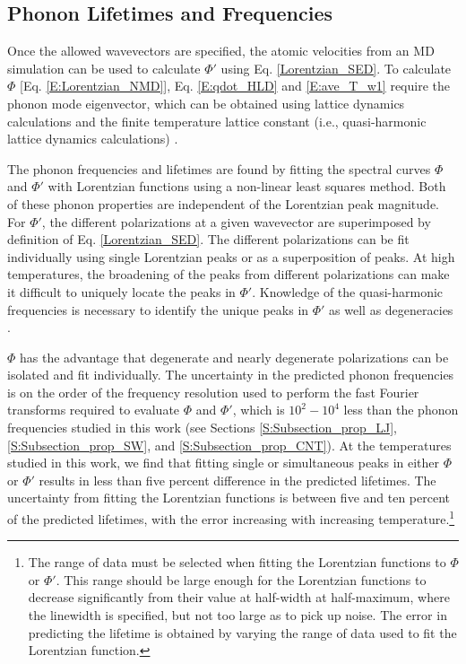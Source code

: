\documentclass[12pt,twocolumn,iop]{/usr/share/texmf-texlive/tex/latex/iop/iopart}[/usr/share/texmf-texlive/tex/latex/iop/]
\begin{document}
\subsection{\label{Subsection_Comp_Details_2}Phonon Lifetimes and Frequencies}

Once the allowed wavevectors are specified, the atomic velocities from an MD simulation can be used to calculate $\Phi'$ using Eq$.$ \eqref{Lorentzian_SED}. To calculate $\Phi$ [Eq$.$ \eqref{E:Lorentzian_NMD}], Eq$.$ \eqref{E:qdot_HLD} and \eqref{E:ave_T_w1} require the phonon mode eigenvector, which can be obtained using lattice dynamics calculations and the finite temperature lattice constant (i.e., quasi-harmonic lattice dynamics calculations) \cite{dove1993}.

The phonon frequencies and lifetimes are found by fitting the spectral curves $\Phi$ and $\Phi'$ with Lorentzian functions using a non-linear least squares method. Both of these phonon properties are independent of the Lorentzian peak magnitude. For $\Phi'$, the different polarizations at a given wavevector are superimposed by definition of Eq$.$ \eqref{Lorentzian_SED}. The different polarizations can be fit individually using single Lorentzian peaks or as a superposition of peaks. At high temperatures, the broadening of the peaks from different polarizations can make it difficult to uniquely locate the peaks in $\Phi'$. Knowledge of the quasi-harmonic frequencies is necessary to identify the unique peaks in $\Phi'$ as well as degeneracies \cite{mcgaughey2006b,turney2009a}.

$\Phi$ has the advantage that degenerate and nearly degenerate polarizations can be isolated and fit individually. The uncertainty in the predicted phonon frequencies is on the order of the frequency resolution used to perform the fast Fourier transforms required to evaluate $\Phi$ and $\Phi'$, which is $10^2-10^4$ less than the phonon frequencies studied in this work (see Sections \ref{S:Subsection_prop_LJ}, \ref{S:Subsection_prop_SW}, and \ref{S:Subsection_prop_CNT}). At the temperatures studied in this work, we find that fitting single or simultaneous peaks in either $\Phi$ or $\Phi'$ results in less than five percent difference in the predicted lifetimes. The uncertainty from fitting the Lorentzian functions is between five and ten percent of the predicted lifetimes, with the error increasing with increasing temperature.\footnote[1]{The range of data must be selected when fitting the Lorentzian functions to $\Phi$ or $\Phi'$. This range should be large enough for the Lorentzian functions to decrease significantly from their value at
half-width at half-maximum, where the linewidth is specified, but not too large as to pick up noise. The error in predicting the lifetime is obtained by varying the range of data
used to fit the Lorentzian function.}
\end{document}
